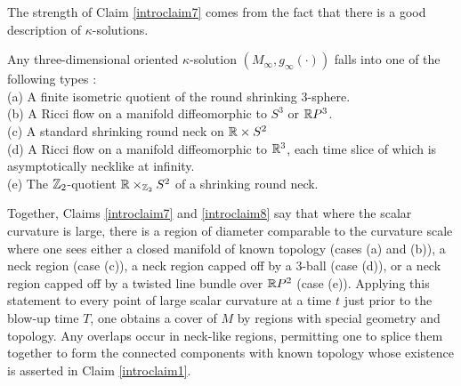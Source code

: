 The strength of Claim \ref{introclaim7} comes from the fact that there
is a good description of  $\kappa$-solutions.

\begin{proposition}
  \label{prop:kl-overview-ricci-flow-approach-manifold-geometrization-rigidity-kappa-solutions}
 \cite{Perelman2} \label{introclaim8}
Any three-dimensional oriented $\kappa$-solution $(M_\infty, g_\infty(\cdot))$ falls
into one of the
following types : \\
(a) A finite isometric quotient of the round shrinking $3$-sphere. \\
(b) A Ricci flow on a  manifold  diffeomorphic to $S^3$ or ${\mathbb R} P^3$. \\
(c) A standard shrinking round neck on ${\mathbb R} \times S^2$ \\
(d) A Ricci flow on a manifold diffeomorphic to ${\mathbb R}^3$, each time slice of
which is  asymptotically necklike at infinity.\\
(e)  The  ${\mathbb Z}_2$-quotient ${\mathbb R} \times_{{\mathbb Z}_2} S^2$ of a  shrinking round neck.
\end{proposition}
Together, Claims \ref{introclaim7} and \ref{introclaim8} say that where the
scalar curvature is large, there is a region of diameter comparable to the
curvature scale  where one  sees either a closed manifold of known topology
(cases (a) and (b)),  a neck region
(case (c)),  a neck region capped off by a $3$-ball (case (d)), or a neck
region capped off by a twisted line bundle over ${\mathbb R} P^2$ (case (e)).
Applying this statement to every point of large scalar curvature at a time $t$
just prior to the blow-up time $T$,
one obtains a cover of $M$ by regions with special geometry and topology.
Any  overlaps occur in neck-like regions,
permitting one to splice them together to form the  connected  components
with known topology  whose existence is asserted in Claim \ref{introclaim1}.

